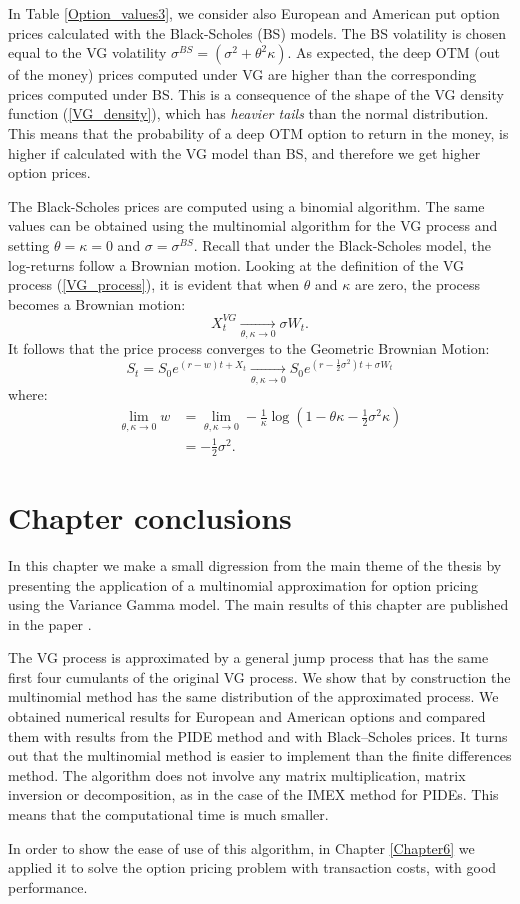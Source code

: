 In Table \ref{Option_values3}, we consider also European and American put option prices 
calculated with the Black-Scholes (BS) models.
The BS volatility is chosen equal to the VG volatility $ \sigma^{BS} = (\sigma^2 + \theta^2 \kappa)$.
As expected, the deep OTM (out of the money) prices computed under VG are higher than the corresponding prices computed under BS. This is a consequence of the
shape of the VG density function (\ref{VG_density}), which has \emph{heavier tails} than the normal distribution. This means that the probability of a deep OTM option to return in the money, 
is higher if calculated with the VG model than BS, and therefore we get higher option prices.

The Black-Scholes prices are computed using a binomial algorithm.  
The same values can be obtained using the multinomial algorithm for the VG process and setting $\theta = \kappa = 0$ and $\sigma = \sigma^{BS}$.
Recall that under the Black-Scholes model, the log-returns follow a Brownian motion. 
Looking at the definition of the VG process (\ref{VG_process}), it is evident that when $\theta$ and $\kappa$ are zero, the process becomes a Brownian motion:
$$ X^{VG}_t \underset{\theta,\kappa \to 0}{\to} \sigma W_t. $$
It follows that the price process converges to the Geometric Brownian Motion:
$$ S_t = S_0 e^{(r-w)t + X_t} \underset{\theta,\kappa \to 0}{\to} S_0 e^{(r-\frac{1}{2}\sigma^2)t + \sigma W_t} $$
where:
\begin{align*}
 \lim_{\theta,\kappa \to 0} w &= \lim_{\theta,\kappa \to 0} -\frac{1}{\kappa} \log(1-\theta \kappa -\frac{1}{2}\sigma^2 \kappa) \\
 &= -\frac{1}{2}\sigma^2.
\end{align*}


\section{Chapter conclusions}


In this chapter we make a small digression from the main theme of the thesis by presenting the application of a multinomial approximation for option pricing 
using the Variance Gamma model.
The main results of this chapter are published in the paper \cite{Canta2}. 

The VG process is approximated by a general jump process that has the same first four cumulants of the original VG process. 
We show that by construction the multinomial method has the same distribution of the approximated process. 
We obtained numerical results for European and American options and compared them with
results from the PIDE method and with Black–Scholes prices. 
It turns out that the
multinomial method is easier to implement than the finite differences method. The algorithm does
not involve any matrix multiplication, matrix inversion or decomposition, as in the case of the IMEX method
for PIDEs. This means that the computational time is much smaller.

In order to show the ease of use of this algorithm, in Chapter \ref{Chapter6} we applied it to solve the option pricing problem with 
transaction costs, with good performance.
